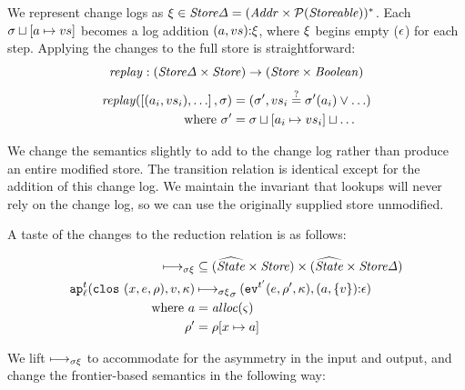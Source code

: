 \documentclass[preprint,onecolumn,9pt]{sigplanconf} %
\begin{document}
We represent change logs as $\msdiff \in \StoreDelta = (\Addr \times
  \Set(\Storeable))^*$. Each $\msto\sqcup[\maddr \mapsto \mval{s}]$
 becomes a log addition
$\cons{\ttuple{\maddr}{\mval{s}}}{\msdiff}$, where $\msdiff$ begins
empty ($\mtlst$) for each step. Applying the changes to the full store
is straightforward:
\begin{equation*}
\replay : (\StoreDelta \times \Store) \to (\Store \times \Boolean)
\end{equation*}
\begin{align*}
\replay(\left[ \ttuple{\maddr_i}{\mval{s_i}}, \ldots\right], \msto) &=
\ttuple{\msto'}
       {\mval{s_i} \overset{?}{=} \msto'(\maddr_i) \vee \ldots} \\
\text{ where } \msto' &= {\msto \sqcup [\maddr_i \mapsto \mval{s_i}] \sqcup \ldots}
\end{align*}

We change the semantics slightly to add to the change log rather than
produce an entire modified store.  The transition relation is
identical except for the addition of this change log.  We maintain the
invariant that lookups will never rely on the change log, so we can
use the originally supplied store unmodified.

A taste of the changes to the reduction relation is as follows:

\begin{align*}
\dmachstep &\subseteq (\widehat{\State}\times\Store) \times (\widehat{\State}\times\StoreDelta) \\
\ap[^\mcntr_\mlab]{\clos{\mvar,\mexp,\menv},\mval,\mkont} & \dmachstep_\msto
\ttuple{\ev[^{\mcntr'}]{\mexp,\menv',\mkont}}{\cons{\ttuple{\maddr}{\setof{\mval}}}{\epsilon}} \\
\text{ where }\maddr &= \alloc(\mstate) \\
              \menv' &= \menv[\mvar\mapsto\maddr]
\end{align*}


We lift $\dmachstep$ to accommodate for the asymmetry
in the input and output, and change the frontier-based semantics in the following way:
\end{document}
